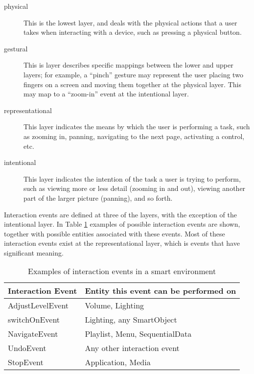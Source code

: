 \begin{description}
\item [physical] This is the lowest layer, and deals with the physical actions that a user takes when interacting with a device, such as pressing a physical button.
\item [gestural] This is layer describes specific mappings between the lower and upper layers; for example, a ``pinch'' gesture may represent the user placing two fingers on a screen and moving them together at the physical layer. This may map to a ``zoom-in'' event at the intentional layer.
\item [representational] This layer indicates the means by which the user is performing a task, such as zooming in, panning, navigating to the next page, activating a control, etc.
\item [intentional] This layer indicates the intention of the task a user is trying to perform, such as viewing more or less detail (zooming in and out), viewing another part of the larger picture (panning), and so forth.
\end{description}

Interaction events are defined at three of the layers, with the exception of the intentional layer. In Table \ref{transformationTable} examples of possible interaction events are shown, together with possible entities associated with these events. Most of these interaction events exist at the representational layer, which is events that have significant meaning.

\begin{table}
\centering
\begin{tabular}{|l|l|}
\hline
Interaction Event & Entity this event can be performed on\\
\hline
AdjustLevelEvent & Volume, Lighting \\
switchOnEvent & Lighting, any SmartObject \\
NavigateEvent & Playlist, Menu, SequentialData \\
UndoEvent & Any other interaction event \\
StopEvent & Application, Media \\
\hline
\end{tabular}
\caption{Examples of interaction events in a smart environment}
\label{transformationTable}
\end{table}



